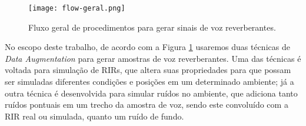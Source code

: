 \begin{figure} [H]
    \centering
    \texttt{[image: flow-geral.png]}
    \caption{Fluxo geral de procedimentos para gerar sinais de voz reverberantes.}
    \label{fig:flow-geral}
\end{figure} 

No escopo deste trabalho, de acordo com a Figura \ref{fig:flow-geral} usaremos duas técnicas de \textit{Data Augmentation} para gerar amostras
de voz reverberantes. Uma das técnicas é voltada para simulação de RIRs, que altera suas propriedades para que possam ser simuladas diferentes condições
e posições em um determinado ambiente; já a outra técnica é desenvolvida para simular ruídos no ambiente, que adiciona tanto ruídos pontuais em um trecho
da amostra de voz, sendo este convoluído com a RIR real ou simulada, quanto um ruído de fundo. 
 
